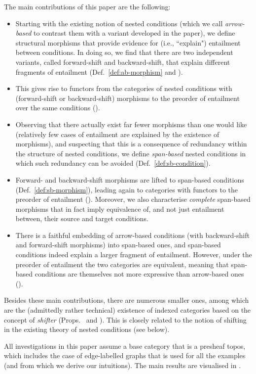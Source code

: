 The main contributions of this paper are the following:

\begin{itemize}
\item Starting with the existing notion of nested conditions (which we call \emph{arrow-based} to contrast them with a variant developed in the paper), we define structural morphisms that provide evidence for (i.e., ``explain") entailment between conditions. In doing so, we find that there are two independent variants, called forward-shift and backward-shift, that explain different fragments of entailment (Def.~\ref{def:ab-morphism} and ).

\item This gives rise to functors from the categories of nested conditions with (forward-shift or backward-shift) morphisms to the preorder of entailment over the same conditions ().

\item Observing that there actually exist far fewer morphisms than one would like (relatively few cases of entailment are explained by the existence of morphisms), and suspecting that this is a consequence of redundancy within the structure of nested conditions, we define \emph{span-based} nested conditions in which such redundancy can be avoided (Def.~\ref{def:sb-condition}).

\item Forward- and backward-shift morphisms are lifted to span-based conditions (Def.~\ref{def:sb-morphism}), leading again to categories with functors to the preorder of entailment (). Moreover, we also characterise \emph{complete} span-based morphisms that in fact imply equivalence of, and not just entailment between, their source and target conditions.

\item There is a faithful embedding of arrow-based conditions (with backward-shift and forward-shift morphisms) into span-based ones, and span-based conditions indeed explain a larger fragment of entailment. However, under the preorder of entailment the two categories are equivalent, meaning that span-based conditions are themselves not more expressive than arrow-based ones ().
\end{itemize}
%
Besides these main contributions, there are numerous smaller ones, among which are the (admittedly rather technical) existence of indexed categories based on the concept of \emph{shifter} (Props.\  and ). This is closely related to the notion of shifting in the existing theory of nested conditions (see below).

All investigations in this paper assume a base category that is a presheaf topos, which includes the case of edge-labelled graphs that is used for all the examples (and from which we derive our intuitions). The main results are visualised in .
